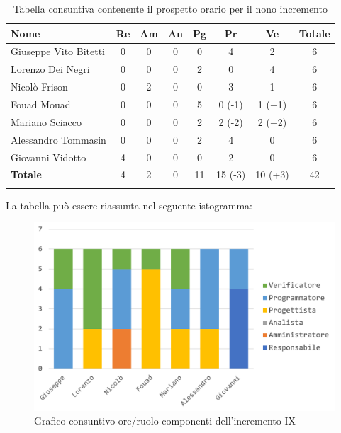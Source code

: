 		\begin{longtable}{|l|c|c|c|c|c|c|c|}
			\hline
			\rowcolor{lighter-grayer}
			\textbf{Nome} & \textbf{Re} & \textbf{Am} & \textbf{An} & \textbf{Pg}  & \textbf{Pr}   & \textbf{Ve} & \textbf{Totale} \\
			\hline
			\endfirsthead
			
			\hline
			Giuseppe Vito Bitetti 		 & 0 & 0 & 0 & 0 & 4 & 2 & 6\\
			\hline
			\hline
			Lorenzo Dei Negri			 & 0 & 0 & 0 & 2 & 0 & 4 & 6\\
			\hline
			\hline
			Nicolò Frison				      & 0 & 2 & 0 & 0 & 3 & 1 & 6\\
			\hline
			\hline
			Fouad Mouad 				   & 0 & 0 & 0 & 5 & 0 (-1) & 1 (+1) & 6\\
			\hline
			\hline
			Mariano Sciacco 			 & 0 & 0 & 0 & 2 & 2 (-2) & 2 (+2) & 6\\
			\hline
			\hline
			Alessandro Tommasin    & 0 & 0 & 0 & 2 & 4 & 0 & 6\\
			\hline
			\hline
			Giovanni Vidotto 			  & 4 & 0 & 0 & 0 & 2 & 0 & 6\\
			\hline 
			\textbf{Totale}			 		& 4 & 2 & 0 & 11 & 15 (-3) & 10 (+3) & 42\\
			\hline
			\caption{Tabella consuntiva 	contenente il prospetto orario per il nono incremento}
		\end{longtable}
		
		La tabella può essere riassunta nel seguente istogramma:
		
		\begin{figure}[H]
			\centering
			\includegraphics[width=0.8\linewidth]{images/consuntivo/ConsIncr9-1.png}
			\caption{Grafico consuntivo ore/ruolo componenti dell'incremento IX}
			\label{fig:consuntivo grafico suddivisione ruoli incremento IXI}
		\end{figure}
		
